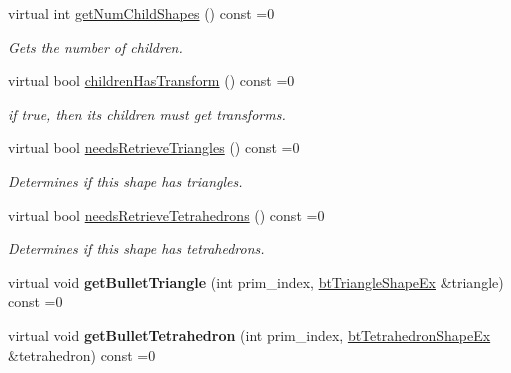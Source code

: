 \begin{DoxyCompactItemize}
virtual int \hyperlink{classbtGImpactShapeInterface_aa145ed4669ce202e97d1a9e1081b3560}{get\+Num\+Child\+Shapes} () const =0
\begin{DoxyCompactList}\small\item\em Gets the number of children. \end{DoxyCompactList}\item 
\mbox{\label{classbtGImpactShapeInterface_a9ea24ba36990721e4f55851afc421e06}} 
virtual bool \hyperlink{classbtGImpactShapeInterface_a9ea24ba36990721e4f55851afc421e06}{children\+Has\+Transform} () const =0
\begin{DoxyCompactList}\small\item\em if true, then its children must get transforms. \end{DoxyCompactList}\item 
\mbox{\label{classbtGImpactShapeInterface_a62093ef330529ac27df9538313ece90a}} 
virtual bool \hyperlink{classbtGImpactShapeInterface_a62093ef330529ac27df9538313ece90a}{needs\+Retrieve\+Triangles} () const =0
\begin{DoxyCompactList}\small\item\em Determines if this shape has triangles. \end{DoxyCompactList}\item 
\mbox{\label{classbtGImpactShapeInterface_ad3f86cd0b7d0bbfd272fd6e815e17485}} 
virtual bool \hyperlink{classbtGImpactShapeInterface_ad3f86cd0b7d0bbfd272fd6e815e17485}{needs\+Retrieve\+Tetrahedrons} () const =0
\begin{DoxyCompactList}\small\item\em Determines if this shape has tetrahedrons. \end{DoxyCompactList}\item 
\mbox{\label{classbtGImpactShapeInterface_a6f9c334805d5bff662e4946eac079a20}} 
virtual void {\bfseries get\+Bullet\+Triangle} (int prim\+\_\+index, \hyperlink{classbtTriangleShapeEx}{bt\+Triangle\+Shape\+Ex} \&triangle) const =0
\item 
\mbox{\label{classbtGImpactShapeInterface_a6259c51d1c8c8239efdd1dd4b918e139}} 
virtual void {\bfseries get\+Bullet\+Tetrahedron} (int prim\+\_\+index, \hyperlink{classbtTetrahedronShapeEx}{bt\+Tetrahedron\+Shape\+Ex} \&tetrahedron) const =0

\end{DoxyCompactItemize}
